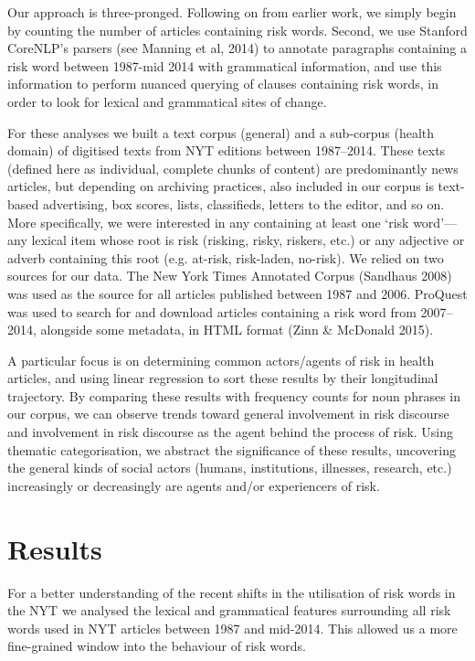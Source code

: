 Our approach is three-pronged. Following on from earlier work, we simply begin by counting the number of articles containing risk words. Second, we use Stanford CoreNLP's parsers (see Manning et al, 2014) to annotate paragraphs containing a risk word between 1987-mid 2014 with grammatical information, and use this information to perform nuanced querying of clauses containing risk words, in order to look for lexical and grammatical sites of change.

For these analyses we built a text corpus (general) and a sub-corpus (health domain) of digitised texts from NYT editions between 1987--2014. These texts (defined here as individual, complete chunks of content) are predominantly news articles, but depending on archiving practices, also included in our corpus is text-based advertising, box scores, lists, classifieds, letters to the editor, and so on. More specifically, we were interested in any containing at least one `risk word'---any lexical item whose root is risk (risking, risky, riskers, etc.) or any adjective or adverb containing this root (e.g. at-risk, risk-laden, no-risk). We relied on two sources for our data. The New York Times Annotated Corpus (Sandhaus 2008) was used as the source for all articles published between 1987 and 2006. ProQuest was used to search for and download articles containing a risk word from 2007--2014, alongside some metadata, in HTML format (Zinn \& McDonald 2015).


A particular focus is on determining common actors\slash agents of risk in health articles, and using linear regression to sort these results by their longitudinal trajectory. By comparing these results with frequency counts for noun phrases in our corpus, we can observe trends toward general involvement in risk discourse and involvement in risk discourse as the agent behind the process of risk. Using thematic categorisation, we abstract the significance of these results, uncovering the general kinds of social actors (humans, institutions, illnesses, research, etc.) increasingly or decreasingly are agents and\slash or experiencers of risk.

\section{Results}

For a better understanding of the recent shifts in the utilisation of risk words in the NYT we analysed the lexical and grammatical features surrounding all risk words used in NYT articles between 1987 and mid-2014. This allowed us a more fine-grained window into the behaviour of risk words. 

